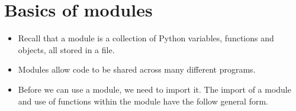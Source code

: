\documentclass[letterpaper,10pt,english]{sphinxmanual}
\begin{document}
\section{Basics of modules}
\label{\detokenize{lecture_notes/lec07_modules_images:basics-of-modules}}\begin{itemize}
\item {} 
Recall that a module is a collection of Python variables, functions
and objects, all stored in a file.

\item {} 
Modules allow code to be shared across many different programs.

\item {} 
Before we can use a module, we need to import it.  The import of a
module and use of functions within the module have the follow
general form.

%
\begin{sphinxVerbatim}[commandchars=\\\{\}]
 
\end{sphinxVerbatim}

\end{itemize}
\end{document}
